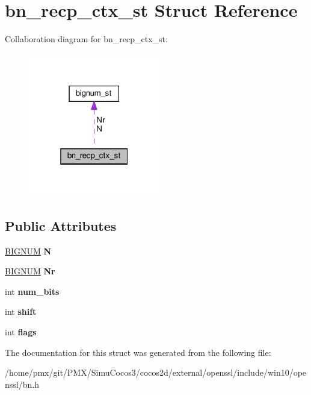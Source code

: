 \hypertarget{structbn__recp__ctx__st}{}\section{bn\+\_\+recp\+\_\+ctx\+\_\+st Struct Reference}
\label{structbn__recp__ctx__st}


Collaboration diagram for bn\+\_\+recp\+\_\+ctx\+\_\+st\+:
\nopagebreak
\begin{figure}[H]
\begin{center}
\leavevmode
\includegraphics[width=163pt]{structbn__recp__ctx__st__coll__graph}
\end{center}
\end{figure}
\subsection*{Public Attributes}
\begin{DoxyCompactItemize}
\item 
\mbox{\label{structbn__recp__ctx__st_ab52e6e895e525fba79d3a18ef2b3dcb8}} 
\hyperlink{structbignum__st}{B\+I\+G\+N\+UM} {\bfseries N}
\item 
\mbox{\label{structbn__recp__ctx__st_a2e7a01e3de39b7998cd21792a0b87565}} 
\hyperlink{structbignum__st}{B\+I\+G\+N\+UM} {\bfseries Nr}
\item 
\mbox{\label{structbn__recp__ctx__st_a685ffc37ed182cdebd42f2382f552cab}} 
int {\bfseries num\+\_\+bits}
\item 
\mbox{\label{structbn__recp__ctx__st_ac74357f903a13ec4404d8e0a2d752ec7}} 
int {\bfseries shift}
\item 
\mbox{\label{structbn__recp__ctx__st_acc82125c857d066e9f20f779d0a2ba3e}} 
int {\bfseries flags}
\end{DoxyCompactItemize}


The documentation for this struct was generated from the following file\+:\begin{DoxyCompactItemize}
\item 
/home/pmx/git/\+P\+M\+X/\+Simu\+Cocos3/cocos2d/external/openssl/include/win10/openssl/bn.\+h\end{DoxyCompactItemize}
